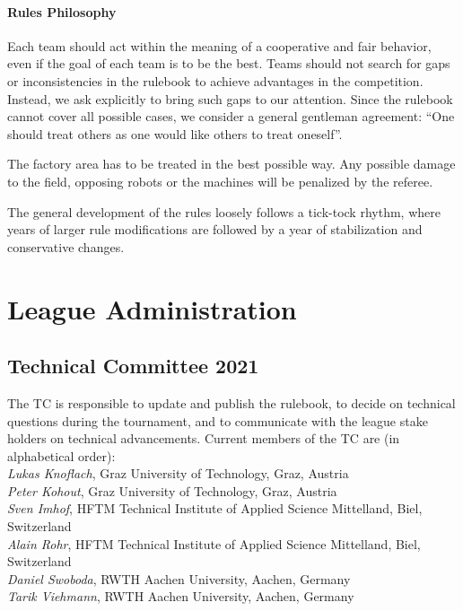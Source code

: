 \documentclass[12pt,twoside]{article}
\begin{document}
\paragraph{Rules Philosophy}
Each team should act within the meaning of a cooperative and fair behavior,
even if the goal of each team is to be the best.
Teams should not search for gaps or inconsistencies in the rulebook to achieve
advantages in the competition. Instead, we ask explicitly to bring such gaps
to our attention. Since the rulebook cannot cover all possible cases, we
consider a general gentleman agreement:
``One should treat others as one would like others to treat oneself''.

The factory area has to be treated in the best possible way.
Any possible damage to the field, opposing robots or the machines will be
penalized by the referee.

The general development of the rules loosely follows a tick-tock
rhythm, where years of larger rule modifications are followed by a
year of stabilization and conservative changes.


\section{League Administration} \label{sec:commitees}
\subsection{Technical Committee 2021}
\label{sec:tc}
The \acf{TC} is responsible to update and publish the
rulebook, to decide on technical questions during the tournament, and
to communicate with the league stake holders on technical
advancements. Current members of the \ac{TC} are
(in alphabetical order):\\[.5em]
\emph{Lukas Knoflach}, Graz University of Technology, Graz, Austria\\
\emph{Peter Kohout}, Graz University of Technology, Graz, Austria\\
\emph{Sven Imhof}, HFTM Technical Institute of Applied Science Mittelland,
Biel, Switzerland\\
\emph{Alain Rohr}, HFTM Technical Institute of Applied Science Mittelland,
Biel, Switzerland\\
\emph{Daniel Swoboda}, RWTH Aachen University, Aachen, Germany\\
\emph{Tarik Viehmann}, RWTH Aachen University, Aachen, Germany
\end{document}
